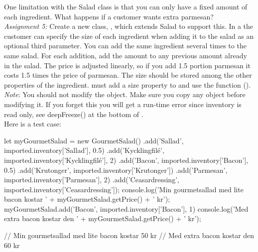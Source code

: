 \documentclass[fleqn, article, a4paper]{memoir}
\begin{document}
\begin{Assignments}
\item One limitation with the Salad class is that you can only have a fixed amount of each ingredient. What happens if a customer wants extra parmesan?
\\\emph{Assignment 5:} 
Create a new class, , which extends Salad to support this. In a  the customer can specify the size of each ingredient when adding it to the salad as an optional third parameter. You can add the same ingredient several times to the same salad. For each addition, add the amount to any previous amount already in the salad. The price is adjusted linearly, so if you add 1.5 portion parmesan it costs 1.5 times the price of parmesan. The size should be stored among the other properties of the ingredient.
 must add a size property to  and use the  function (). 
\\\emph{Note}: You should not modify the  object. Make sure you copy any object before modifying it. If you forget this you will get a run-time error since inventory is read only, see deepFreeze() at the bottom of .
\\ Here is a test case:
\begin{Code}
let myGourmetSalad = new GourmetSalad()
.add('Sallad', imported.inventory['Sallad'], 0.5)
.add('Kycklingfilé', imported.inventory['Kycklingfilé'], 2)
.add('Bacon', imported.inventory['Bacon'], 0.5)
.add('Krutonger', imported.inventory['Krutonger'])
.add('Parmesan', imported.inventory['Parmesan'], 2)
.add('Ceasardressing', imported.inventory['Ceasardressing']);
console.log('Min gourmetsallad med lite bacon kostar '
    + myGourmetSalad.getPrice() + ' kr');
myGourmetSalad.add('Bacon', imported.inventory['Bacon'], 1)
console.log('Med extra bacon kostar den '
    + myGourmetSalad.getPrice() + ' kr');

// Min gourmetsallad med lite bacon kostar 50 kr
// Med extra bacon kostar den 60 kr
\end{Code}


\end{Assignments}
\end{document}
